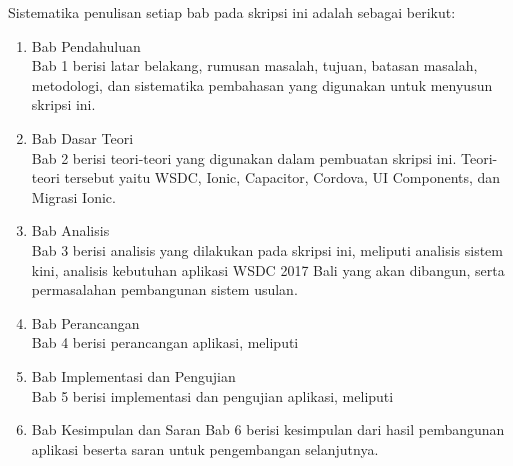 Sistematika penulisan setiap bab pada skripsi ini adalah sebagai berikut:
\begin{enumerate}
	\item Bab Pendahuluan \\
	Bab 1 berisi latar belakang, rumusan masalah, tujuan, batasan masalah, metodologi, dan sistematika pembahasan yang digunakan untuk menyusun skripsi ini.
	\item Bab Dasar Teori \\
	Bab 2 berisi teori-teori yang digunakan dalam pembuatan skripsi ini. Teori-teori tersebut yaitu WSDC, Ionic, Capacitor, Cordova, UI Components, dan Migrasi Ionic.
	\item Bab Analisis \\
	Bab 3 berisi analisis yang dilakukan pada skripsi ini, meliputi analisis sistem kini, analisis kebutuhan aplikasi WSDC 2017 Bali yang akan dibangun, serta permasalahan pembangunan sistem usulan.
	\item Bab Perancangan \\
	Bab 4 berisi perancangan aplikasi, meliputi
	\item Bab Implementasi dan Pengujian \\
	Bab 5 berisi implementasi dan pengujian aplikasi, meliputi
	\item Bab Kesimpulan dan Saran
	Bab 6 berisi kesimpulan dari hasil pembangunan aplikasi beserta saran untuk pengembangan selanjutnya.
	\end{enumerate}
